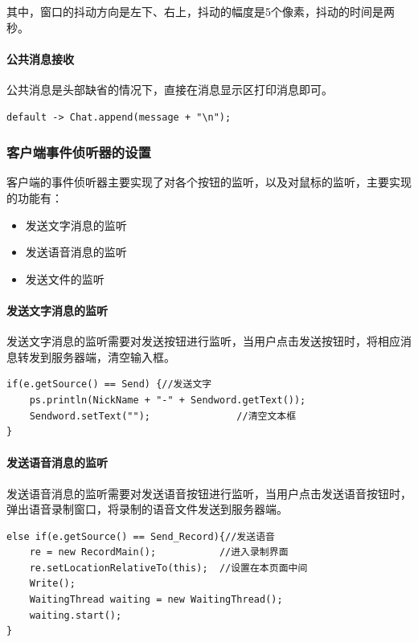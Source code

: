 \documentclass[UTF8,12pt]{article}
\begin{document}
其中，窗口的抖动方向是左下、右上，抖动的幅度是5个像素，抖动的时间是两秒。

\paragraph{公共消息接收}
公共消息是头部缺省的情况下，直接在消息显示区打印消息即可。

\begin{lstlisting}[title=公共消息接收,frame=shadowbox]
    default -> Chat.append(message + "\n");
\end{lstlisting}

\subsubsection{客户端事件侦听器的设置}
客户端的事件侦听器主要实现了对各个按钮的监听，以及对鼠标的监听，主要实现的功能有：
\begin{itemize}
    \item 发送文字消息的监听
    \item 发送语音消息的监听
    \item 发送文件的监听
\end{itemize}

\paragraph{发送文字消息的监听}
发送文字消息的监听需要对发送按钮进行监听，当用户点击发送按钮时，将相应消息转发到服务器端，清空输入框。

\begin{lstlisting}[title=发送文字消息的监听,frame=shadowbox]
    if(e.getSource() == Send) {//发送文字
    ps.println(NickName + "-" + Sendword.getText());
    Sendword.setText("");               //清空文本框
} 
\end{lstlisting}

\paragraph{发送语音消息的监听}
发送语音消息的监听需要对发送语音按钮进行监听，当用户点击发送语音按钮时，弹出语音录制窗口，将录制的语音文件发送到服务器端。

\begin{lstlisting}[title=发送语音消息的监听,frame=shadowbox]
    else if(e.getSource() == Send_Record){//发送语音
    re = new RecordMain();           //进入录制界面
    re.setLocationRelativeTo(this);  //设置在本页面中间
    Write();
    WaitingThread waiting = new WaitingThread();
    waiting.start();
}
\end{lstlisting}
\end{document}
